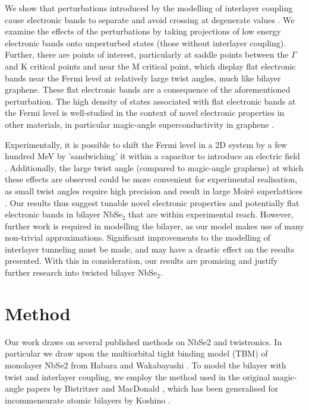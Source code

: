 \documentclass[12pt]{report} %
\begin{document}
  We show that perturbations introduced by the modelling of interlayer coupling cause electronic bands to separate and avoid crossing at degenerate values \cite{Verhoeven1996, Cohen-Tannoudji2006}. We examine the effects of the perturbations by taking projections of low energy electronic bands onto unperturbed states (those without interlayer coupling). Further, there are points of interest, particularly at saddle points between the $\Gamma$ and K critical points and near the M critical point, which display flat electronic bands near the Fermi level at relatively large twist angles, much like bilayer graphene. These flat electronic bands are a consequence of the aforementioned perturbation. The high density of states associated with flat electronic bands at the Fermi level is well-studied in the context of novel electronic properties in other materials, in particular magic-angle superconductivity in graphene \cite{Cao2018, Bistritzer2011}.

  Experimentally, it is possible to shift the Fermi level in a 2D system by a few hundred MeV by 'sandwiching' it within a capacitor to introduce an electric field \cite{Díaz-Fernández2017}. Additionally, the large twist angle (compared to magic-angle graphene) at which these effects are observed could be more convenient for experimental realisation, as small twist angles require high precision and result in large Moir\'{e} superlattices \cite{Tao2022}. Our results thus suggest tunable novel electronic properties and potentially flat electronic bands in bilayer NbSe$_2$ that are within experimental reach. However, further work is required in modelling the bilayer, as our model makes use of many non-trivial approximations. Significant improvements to the modelling of interlayer tunneling must be made, and may have a drastic effect on the results presented. With this in consideration, our results are promising and justify further research into twisted bilayer NbSe$_2$.

\section*{Method}
  Our work draws on several published methods on NbSe2 and twistronics. In particular we draw upon the multiorbital tight binding model (TBM) of monolayer NbSe2 from Habara and Wakabayashi \cite{Habara2021}. To model the bilayer with twist and interlayer coupling, we employ the method used in the original magic-angle papers by Bistritzer and MacDonald \cite{Bistritzer2010, Bistritzer2011}, which has been generalised for incommensurate atomic bilayers by Koshino \cite{Koshino2015}. 
\end{document}
